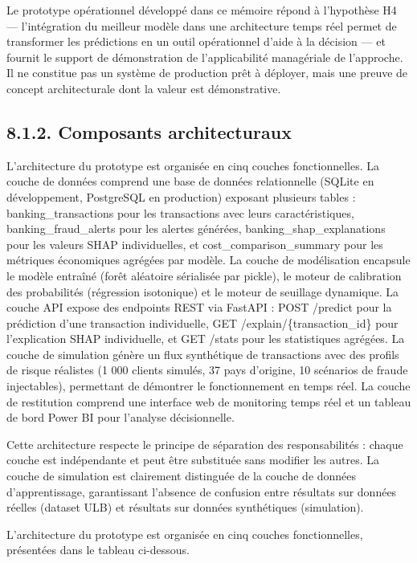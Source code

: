 Le prototype opérationnel développé dans ce mémoire répond à l'hypothèse H4 — l'intégration du meilleur modèle dans une architecture temps réel permet de transformer les prédictions en un outil opérationnel d'aide à la décision — et fournit le support de démonstration de l'applicabilité managériale de l'approche. Il ne constitue pas un système de production prêt à déployer, mais une preuve de concept architecturale dont la valeur est démonstrative.

\subsection{8.1.2. Composants architecturaux}

L'architecture du prototype est organisée en cinq couches fonctionnelles. La couche de données comprend une base de données relationnelle (SQLite en développement, PostgreSQL en production) exposant plusieurs tables : banking\_transactions pour les transactions avec leurs caractéristiques, banking\_fraud\_alerts pour les alertes générées, banking\_shap\_explanations pour les valeurs SHAP individuelles, et cost\_comparison\_summary pour les métriques économiques agrégées par modèle. La couche de modélisation encapsule le modèle entraîné (forêt aléatoire sérialisée par pickle), le moteur de calibration des probabilités (régression isotonique) et le moteur de seuillage dynamique. La couche API expose des endpoints REST via FastAPI : POST /predict pour la prédiction d'une transaction individuelle, GET /explain/\{transaction\_id\} pour l'explication SHAP individuelle, et GET /stats pour les statistiques agrégées. La couche de simulation génère un flux synthétique de transactions avec des profils de risque réalistes (1 000 clients simulés, 37 pays d'origine, 10 scénarios de fraude injectables), permettant de démontrer le fonctionnement en temps réel. La couche de restitution comprend une interface web de monitoring temps réel et un tableau de bord Power BI pour l'analyse décisionnelle.

Cette architecture respecte le principe de séparation des responsabilités : chaque couche est indépendante et peut être substituée sans modifier les autres. La couche de simulation est clairement distinguée de la couche de données d'apprentissage, garantissant l'absence de confusion entre résultats sur données réelles (dataset ULB) et résultats sur données synthétiques (simulation).

L'architecture du prototype est organisée en cinq couches fonctionnelles, présentées dans le tableau ci-dessous.

